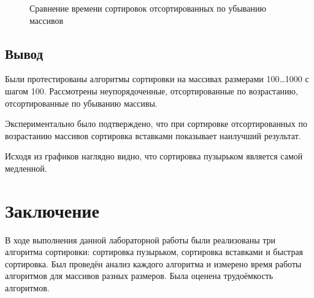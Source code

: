 \documentclass[12pt]{report}
\begin{document}
\begin{figure}
    \centering
{}
\caption{Сравнение времени сортировок отсортированных по убыванию массивов} 
\label{plot:SortedDown}
\end{figure}

\newpage
\section{Вывод}
Были протестированы алгоритмы сортировки на массивах размерами 100…1000 с шагом 100. Рассмотрены неупорядоченные, отсортированные по возрастанию, отсортированные по убыванию массивы.

Экспериментально было подтверждено, что при сортировке отсортированных по возрастанию массивов сортировка вставками показывает наилучший результат.

Исходя из графиков наглядно видно, что сортировка пузырьком является самой медленной.

\chapter*{Заключение}
В ходе выполнения данной лабораторной работы были реализованы три алгоритма сортировки: сортировка пузырьком, сортировка вставками и быстрая сортировка. Был проведён анализ каждого алгоритма и измерено время работы алгоритмов для массивов разных размеров. Была оценена трудоёмкость алгоритмов.
\end{document}
